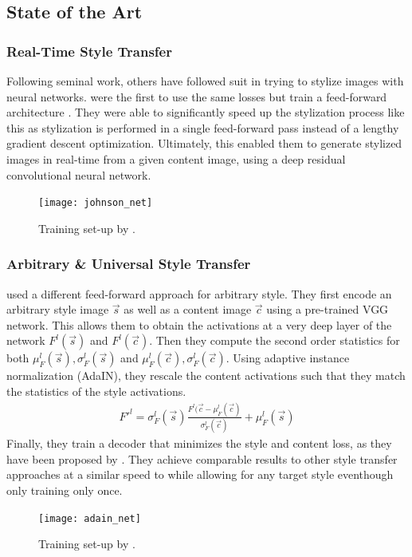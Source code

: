 \subsection{State of the Art}

\subsubsection{Real-Time Style Transfer}
Following \citeauthor*{gatys} seminal work, others have followed suit in trying to stylize images with neural networks.
\citeauthor*{johnson} were the first to use the same losses but train a feed-forward architecture \cite{johnson}.
They were able to significantly speed up the stylization process like this as stylization is performed in a single feed-forward pass instead of a lengthy gradient descent optimization.
Ultimately, this enabled them to generate stylized images in real-time from a given content image, using a deep residual convolutional neural network.
\begin{figure}
    \texttt{[image: johnson\_net]}
    \caption{Training set-up by \citeauthor*{johnson}. \cite{johnson}}
\end{figure}

\subsubsection{Arbitrary \& Universal Style Transfer}
\citeauthor*{AdaIN} used a different feed-forward approach for arbitrary style.
They first encode an arbitrary style image $\vec{s}$ as well as a content image $\vec{c}$ using a pre-trained VGG network.
This allows them to obtain the activations at a very deep layer of the network $F^l(\vec{s})$ and $F^l(\vec{c})$.
Then they compute the second order statistics for both $\mu_F^l(\vec{s}), \sigma_F^l(\vec{s})$ and $\mu_F^l(\vec{c}), \sigma_F^l(\vec{c})$.
Using adaptive instance normalization (AdaIN), they rescale the content activations such that they match the statistics of the style activations.
\begin{align}
    F'^l = \sigma_F^l(\vec{s}) \frac{F^l(\vec{c} - \mu_F^l(\vec{c})}{\sigma_F^l(\vec{c})} + \mu_F^l(\vec{s}) 
\end{align}
Finally, they train a decoder that minimizes the style and content loss, as they have been proposed by \citeauthor*{gatys}.
They achieve comparable results to other style transfer approaches at a similar speed to \citeauthor*{johnson} while allowing for any target style eventhough only training only once.
\begin{figure}
    \texttt{[image: adain\_net]}
    \caption{Training set-up by \citeauthor*{AdaIN}. \cite{AdaIN}}
\end{figure}

